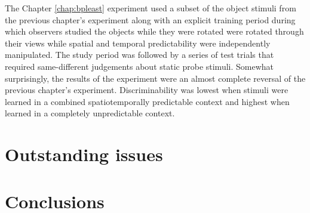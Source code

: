 \documentclass[dwyatte_dissertation.tex]{subfiles}
\begin{document}
The Chapter \ref{chap:bpleast} experiment used a subset of the object stimuli from the previous chapter's experiment along with an explicit training period during which observers studied the objects while they were rotated were rotated through their views while spatial and temporal predictability were independently manipulated. The study period was followed by a series of test trials that required same-different judgements about static probe stimuli. Somewhat surprisingly, the results of the experiment were an almost complete reversal of the previous chapter's experiment. Discriminability was lowest when stimuli were learned in a combined spatiotemporally predictable context and highest when learned in a completely unpredictable context.


\section{Outstanding issues}



%
%


\section{Conclusions}



\end{document}
